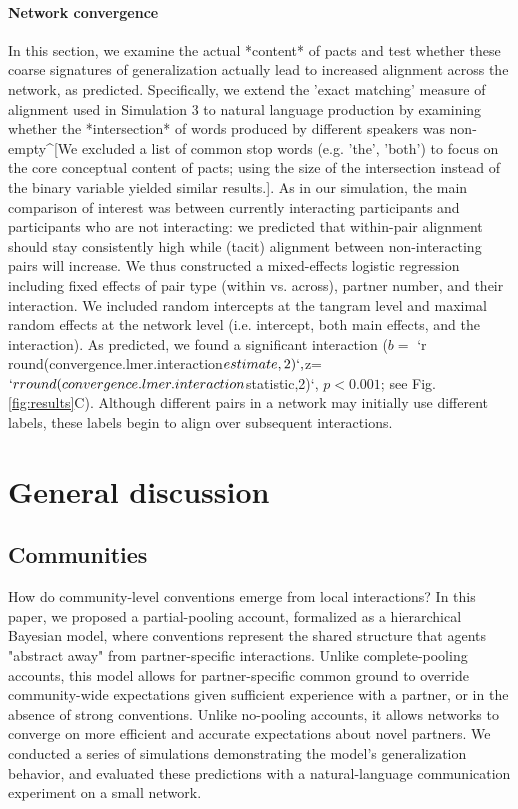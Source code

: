 \documentclass[11pt, floatsintext]{apa6}
\begin{document}
\paragraph{Network convergence }

In this section, we examine the actual *content* of pacts and test whether these coarse signatures of generalization actually lead to increased alignment across the network, as predicted. 
Specifically, we extend the 'exact matching' measure of alignment used in Simulation 3 to natural language production by examining whether the *intersection* of words produced by different speakers was non-empty^[We excluded a list of common stop words (e.g. 'the', 'both') to focus on the core conceptual content of pacts; using the size of the intersection instead of the binary variable yielded similar results.].
As in our simulation, the main comparison of interest was between currently interacting participants and participants who are not interacting: we predicted that within-pair alignment should stay consistently high while (tacit) alignment between non-interacting pairs will increase. 
We thus constructed a mixed-effects logistic regression including fixed effects of pair type (within vs. across), partner number, and their interaction.
We included random intercepts at the tangram level and maximal random effects at the network level (i.e. intercept, both main effects, and the interaction).
As predicted, we found a significant interaction ($b =$ `r round(convergence.lmer.interaction$estimate,2)`, $z=$ `r round(convergence.lmer.interaction$statistic,2)`, $p<0.001$; see Fig. \ref{fig:results}C).
Although different pairs in a network may initially use different labels, these labels begin to align over subsequent interactions. 

\section{General discussion}

\subsection{Communities}

How do community-level conventions emerge from local interactions? 
In this paper, we proposed a partial-pooling account, formalized as a hierarchical Bayesian model, where conventions represent the shared structure that agents "abstract away" from partner-specific interactions.
Unlike complete-pooling accounts, this model allows for partner-specific common ground to override community-wide expectations given sufficient experience with a partner, or in the absence of strong conventions.
Unlike no-pooling accounts, it allows networks to converge on more efficient and accurate expectations about novel partners.
We conducted a series of simulations demonstrating the model's generalization behavior, and evaluated these predictions with a natural-language communication experiment on a small network.
\end{document}
